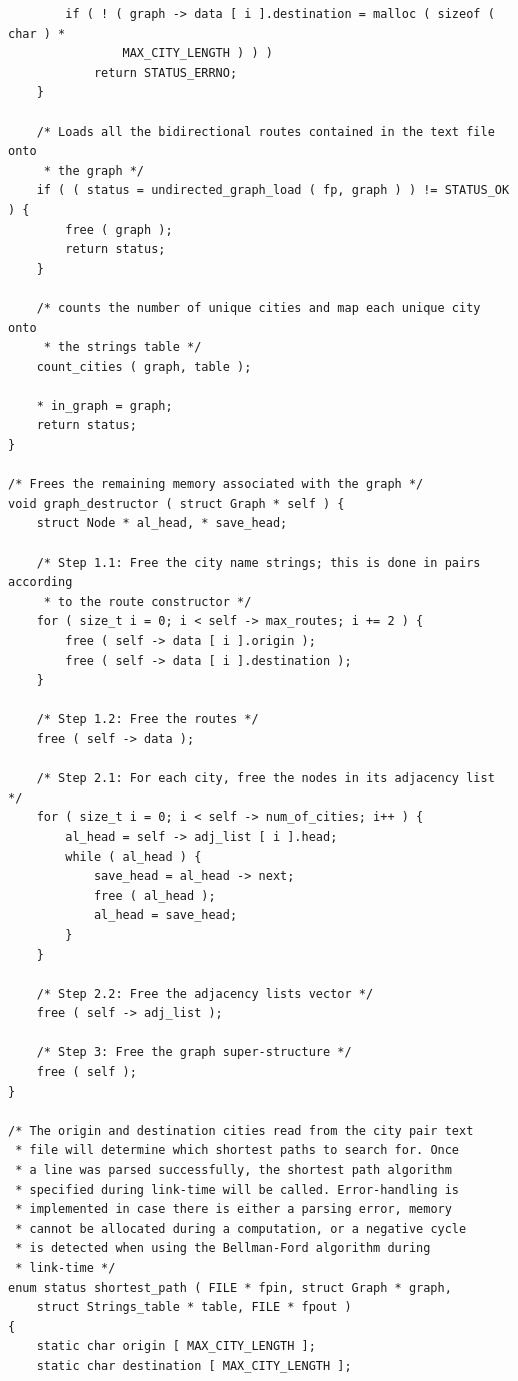 \documentclass[11pt]{article}
\begin{document}
\begin{verbatim}
        if ( ! ( graph -> data [ i ].destination = malloc ( sizeof ( char ) *
                MAX_CITY_LENGTH ) ) )
            return STATUS_ERRNO;
    }

    /* Loads all the bidirectional routes contained in the text file onto
     * the graph */
    if ( ( status = undirected_graph_load ( fp, graph ) ) != STATUS_OK ) {
        free ( graph );
        return status;
    }

    /* counts the number of unique cities and map each unique city onto
     * the strings table */
    count_cities ( graph, table );

    * in_graph = graph;
    return status;
}

/* Frees the remaining memory associated with the graph */
void graph_destructor ( struct Graph * self ) {
    struct Node * al_head, * save_head;

    /* Step 1.1: Free the city name strings; this is done in pairs according
     * to the route constructor */
    for ( size_t i = 0; i < self -> max_routes; i += 2 ) {
        free ( self -> data [ i ].origin );
        free ( self -> data [ i ].destination );
    }

    /* Step 1.2: Free the routes */
    free ( self -> data );

    /* Step 2.1: For each city, free the nodes in its adjacency list */
    for ( size_t i = 0; i < self -> num_of_cities; i++ ) {
        al_head = self -> adj_list [ i ].head;
        while ( al_head ) {
            save_head = al_head -> next;
            free ( al_head );
            al_head = save_head;
        }
    }

    /* Step 2.2: Free the adjacency lists vector */
    free ( self -> adj_list );

    /* Step 3: Free the graph super-structure */
    free ( self );
}

/* The origin and destination cities read from the city pair text
 * file will determine which shortest paths to search for. Once
 * a line was parsed successfully, the shortest path algorithm
 * specified during link-time will be called. Error-handling is
 * implemented in case there is either a parsing error, memory
 * cannot be allocated during a computation, or a negative cycle
 * is detected when using the Bellman-Ford algorithm during
 * link-time */
enum status shortest_path ( FILE * fpin, struct Graph * graph,
    struct Strings_table * table, FILE * fpout )
{
    static char origin [ MAX_CITY_LENGTH ];
    static char destination [ MAX_CITY_LENGTH ];


\end{verbatim}
\end{document}
